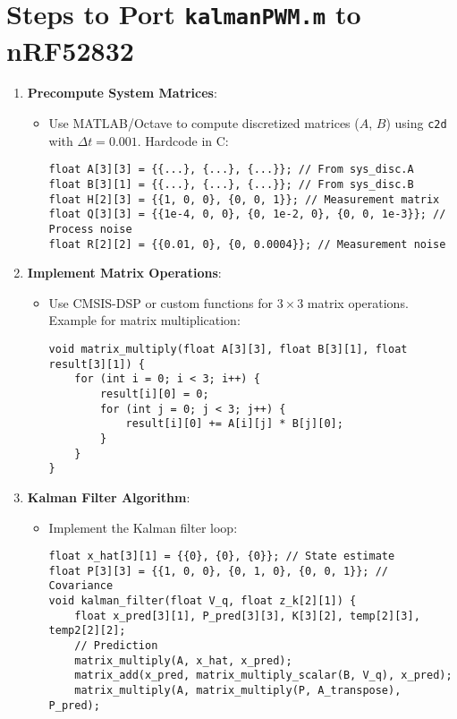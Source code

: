 \documentclass[a4paper,11pt]{article}
\begin{document}
\section{Steps to Port \texttt{kalmanPWM.m} to nRF52832}
\begin{enumerate}
    \item \textbf{Precompute System Matrices}:
    \begin{itemize}
        \item Use MATLAB/Octave to compute discretized matrices ($A$, $B$) using \texttt{c2d} with $\Delta t = 0.001$. Hardcode in C:
        \begin{lstlisting}
float A[3][3] = {{...}, {...}, {...}}; // From sys_disc.A
float B[3][1] = {{...}, {...}, {...}}; // From sys_disc.B
float H[2][3] = {{1, 0, 0}, {0, 0, 1}}; // Measurement matrix
float Q[3][3] = {{1e-4, 0, 0}, {0, 1e-2, 0}, {0, 0, 1e-3}}; // Process noise
float R[2][2] = {{0.01, 0}, {0, 0.0004}}; // Measurement noise
        \end{lstlisting}
    \end{itemize}
    \item \textbf{Implement Matrix Operations}:
    \begin{itemize}
        \item Use CMSIS-DSP or custom functions for $3 \times 3$ matrix operations. Example for matrix multiplication:
        \begin{lstlisting}
void matrix_multiply(float A[3][3], float B[3][1], float result[3][1]) {
    for (int i = 0; i < 3; i++) {
        result[i][0] = 0;
        for (int j = 0; j < 3; j++) {
            result[i][0] += A[i][j] * B[j][0];
        }
    }
}
        \end{lstlisting}
    \end{itemize}
    \item \textbf{Kalman Filter Algorithm}:
    \begin{itemize}
        \item Implement the Kalman filter loop:
        \begin{lstlisting}
float x_hat[3][1] = {{0}, {0}, {0}}; // State estimate
float P[3][3] = {{1, 0, 0}, {0, 1, 0}, {0, 0, 1}}; // Covariance
void kalman_filter(float V_q, float z_k[2][1]) {
    float x_pred[3][1], P_pred[3][3], K[3][2], temp[2][3], temp2[2][2];
    // Prediction
    matrix_multiply(A, x_hat, x_pred);
    matrix_add(x_pred, matrix_multiply_scalar(B, V_q), x_pred);
    matrix_multiply(A, matrix_multiply(P, A_transpose), P_pred);

\end{lstlisting}
\end{itemize}
\end{enumerate}
\end{document}
